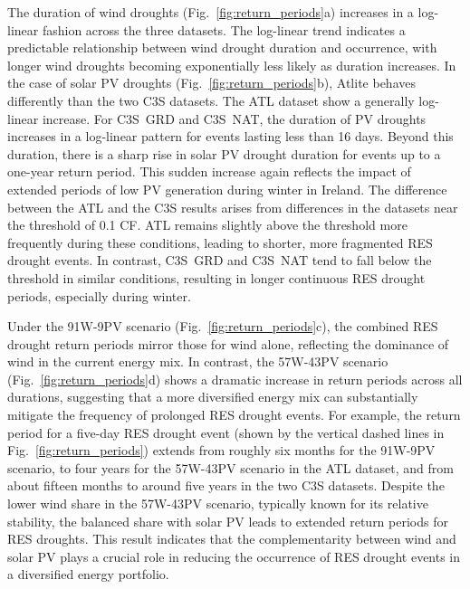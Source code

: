 \documentclass[preprint, 12pt]{elsarticle}
\begin{document}
The duration of wind droughts (Fig.~\ref{fig:return_periods}a) increases in a log-linear fashion across the three datasets. The log-linear trend indicates a predictable relationship between wind drought duration and occurrence, with longer wind droughts becoming exponentially less likely as duration increases. In the case of solar PV droughts (Fig.~\ref{fig:return_periods}b), Atlite behaves differently than the two C3S datasets. The ATL dataset show a generally log-linear increase. For C3S~GRD and C3S~NAT, the duration of PV droughts increases in a log-linear pattern for events lasting less than 16 days. Beyond this duration, there is a sharp rise in solar PV drought duration for events up to a one-year return period. This sudden increase again reflects the impact of extended periods of low PV generation during winter in Ireland. The difference between the ATL and the C3S results arises from differences in the datasets near the threshold of 0.1 CF. ATL remains slightly above the threshold more frequently during these conditions, leading to shorter, more fragmented RES drought events. In contrast, C3S~GRD and C3S~NAT tend to fall below the threshold in similar conditions, resulting in longer continuous RES drought periods, especially during winter.

Under the 91W-9PV scenario (Fig.~\ref{fig:return_periods}c), the combined RES drought return periods mirror those for wind alone, reflecting the dominance of wind in the current energy mix. In contrast, the 57W-43PV scenario (Fig.~\ref{fig:return_periods}d) shows a dramatic increase in return periods across all durations, suggesting that a more diversified energy mix can substantially mitigate the frequency of prolonged RES drought events. For example, the return period for a five-day RES drought event (shown by the vertical dashed lines in Fig.~\ref{fig:return_periods}) extends from roughly six months for the 91W-9PV scenario, to four years for the 57W-43PV scenario in the ATL dataset, and from about fifteen months to around five years in the two C3S datasets. Despite the lower wind share in the 57W-43PV scenario, typically known for its relative stability, the balanced share with solar PV leads to extended return periods for RES droughts. This result indicates that the complementarity between wind and solar PV plays a crucial role in reducing the occurrence of RES drought events in a diversified energy portfolio.
\end{document}
